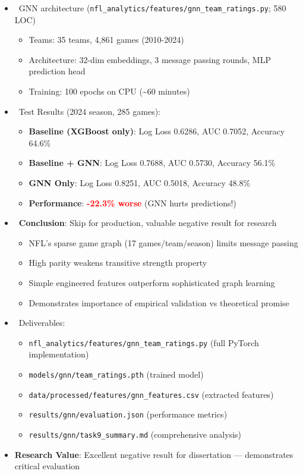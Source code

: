 \begin{itemize}
  \item \done\ GNN architecture (\texttt{nfl\_analytics/features/gnn\_team\_ratings.py}; 580 LOC)
  \begin{itemize}
    \item Teams: 35 teams, 4,861 games (2010-2024)
    \item Architecture: 32-dim embeddings, 3 message passing rounds, MLP prediction head
    \item Training: 100 epochs on CPU (\textasciitilde 60 minutes)
  \end{itemize}
  \item \done\ Test Results (2024 season, 285 games):
  \begin{itemize}
    \item \textbf{Baseline (XGBoost only)}: Log Loss 0.6286, AUC 0.7052, Accuracy 64.6\%
    \item \textbf{Baseline + GNN}: Log Loss 0.7688, AUC 0.5730, Accuracy 56.1\%
    \item \textbf{GNN Only}: Log Loss 0.8251, AUC 0.5018, Accuracy 48.8\%
    \item \textbf{Performance}: \textcolor{red}{\textbf{-22.3\% worse}} (GNN hurts predictions!)
  \end{itemize}
  \item \done\ \textbf{Conclusion}: Skip for production, valuable negative result for research
  \begin{itemize}
    \item NFL's sparse game graph (17 games/team/season) limits message passing
    \item High parity weakens transitive strength property
    \item Simple engineered features outperform sophisticated graph learning
    \item Demonstrates importance of empirical validation vs theoretical promise
  \end{itemize}
  \item \done\ Deliverables:
  \begin{itemize}
    \item \texttt{nfl\_analytics/features/gnn\_team\_ratings.py} (full PyTorch implementation)
    \item \texttt{models/gnn/team\_ratings.pth} (trained model)
    \item \texttt{data/processed/features/gnn\_features.csv} (extracted features)
    \item \texttt{results/gnn/evaluation.json} (performance metrics)
    \item \texttt{results/gnn/task9\_summary.md} (comprehensive analysis)
  \end{itemize}
  \item \textbf{Research Value}: Excellent negative result for dissertation — demonstrates critical evaluation
\end{itemize}

